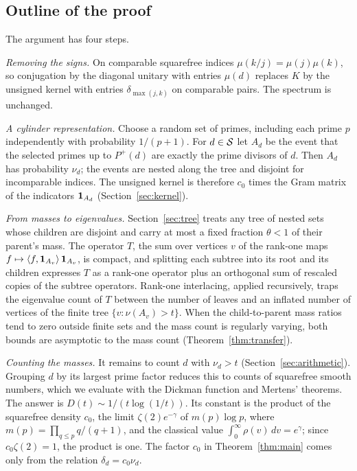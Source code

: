 \subsection{Outline of the proof}
The argument has four steps.

\emph{Removing the signs.} On comparable squarefree indices
$\mu(k/j)=\mu(j)\mu(k)$, so conjugation by the diagonal unitary with
entries $\mu(d)$ replaces $K$ by the unsigned kernel with entries
$\delta_{\max(j,k)}$ on comparable pairs. The spectrum is unchanged.

\emph{A cylinder representation.} Choose a random set of primes, including
each prime $p$ independently with probability $1/(p+1)$. For $d\in\mathcal S$ let
$A_d$ be the event that the selected primes up to $P^+(d)$ are exactly the
prime divisors of $d$. Then $A_d$ has probability $\nu_d$; the events are
nested along the tree and disjoint for incomparable indices. The unsigned
kernel is therefore $c_0$ times the Gram matrix of the indicators
$\mathbf 1_{A_d}$ (Section~\ref{sec:kernel}).

\emph{From masses to eigenvalues.} Section~\ref{sec:tree} treats any tree
of nested sets whose children are disjoint and carry at most a fixed
fraction $\theta<1$ of their parent's mass. The operator $T$, the sum
over vertices $v$ of the rank-one maps
$f\mapsto\left\langle f,\mathbf 1_{A_v}\right\rangle\mathbf 1_{A_v}$, is compact, and splitting each subtree into
its root and its children expresses $T$ as a rank-one operator plus an
orthogonal sum of rescaled copies of the subtree operators. Rank-one
interlacing, applied recursively, traps the eigenvalue count of $T$
between the number of leaves and an inflated number of vertices of the
finite tree $\{v:\nu(A_v)>t\}$. When the child-to-parent mass ratios tend
to zero outside finite sets and the mass count is regularly varying, both
bounds are asymptotic to the mass count (Theorem~\ref{thm:transfer}).

\emph{Counting the masses.} It remains to count $d$ with $\nu_d>t$
(Section~\ref{sec:arithmetic}). Grouping $d$ by its largest prime factor
reduces this to counts of squarefree smooth numbers, which we evaluate
with the Dickman function and Mertens' theorems. The answer is
$D(t)\sim1/(t\log(1/t))$. Its constant is the product of the squarefree
density $c_0$, the limit $\zeta(2)e^{-\gamma}$ of $m(p)\log p$, where
$m(p)=\prod_{q\le p}q/(q+1)$, and the classical value
$\int_0^\infty\rho(v)\,dv=e^\gamma$; since $c_0\zeta(2)=1$, the product
is one. The factor $c_0$ in Theorem~\ref{thm:main} comes only from the
relation $\delta_d=c_0\nu_d$.

